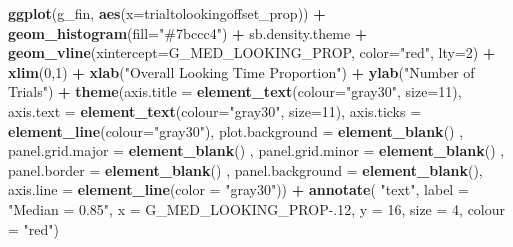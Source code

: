 \documentclass[
  doc,floatsintext]{apa6}
\newenvironment{Shaded}{\begin{snugshade}}{\end{snugshade}}
\newcommand{\AttributeTok}[1]{\textcolor[rgb]{0.13,0.29,0.53}{#1}}
\newcommand{\DecValTok}[1]{\textcolor[rgb]{0.00,0.00,0.81}{#1}}
\newcommand{\FloatTok}[1]{\textcolor[rgb]{0.00,0.00,0.81}{#1}}
\newcommand{\FunctionTok}[1]{\textcolor[rgb]{0.13,0.29,0.53}{\textbf{#1}}}
\newcommand{\NormalTok}[1]{#1}
\newcommand{\SpecialCharTok}[1]{\textcolor[rgb]{0.81,0.36,0.00}{\textbf{#1}}}
\newcommand{\StringTok}[1]{\textcolor[rgb]{0.31,0.60,0.02}{#1}}
\begin{document}
\begin{Shaded}
\begin{Highlighting}[]
\FunctionTok{ggplot}\NormalTok{(g\_fin, }\FunctionTok{aes}\NormalTok{(}\AttributeTok{x=}\NormalTok{trialtolookingoffset\_prop)) }\SpecialCharTok{+}
  \FunctionTok{geom\_histogram}\NormalTok{(}\AttributeTok{fill=}\StringTok{"\#7bccc4"}\NormalTok{) }\SpecialCharTok{+}
\NormalTok{  sb.density.theme }\SpecialCharTok{+}
  \FunctionTok{geom\_vline}\NormalTok{(}\AttributeTok{xintercept=}\NormalTok{G\_MED\_LOOKING\_PROP, }\AttributeTok{color=}\StringTok{"red"}\NormalTok{, }\AttributeTok{lty=}\DecValTok{2}\NormalTok{) }\SpecialCharTok{+}
  \FunctionTok{xlim}\NormalTok{(}\DecValTok{0}\NormalTok{,}\DecValTok{1}\NormalTok{) }\SpecialCharTok{+}
  \FunctionTok{xlab}\NormalTok{(}\StringTok{"Overall Looking Time Proportion"}\NormalTok{) }\SpecialCharTok{+}
  \FunctionTok{ylab}\NormalTok{(}\StringTok{"Number of Trials"}\NormalTok{) }\SpecialCharTok{+} 
  \FunctionTok{theme}\NormalTok{(}\AttributeTok{axis.title =} \FunctionTok{element\_text}\NormalTok{(}\AttributeTok{colour=}\StringTok{"gray30"}\NormalTok{, }\AttributeTok{size=}\DecValTok{11}\NormalTok{),}
        \AttributeTok{axis.text =} \FunctionTok{element\_text}\NormalTok{(}\AttributeTok{colour=}\StringTok{"gray30"}\NormalTok{, }\AttributeTok{size=}\DecValTok{11}\NormalTok{),}
        \AttributeTok{axis.ticks =} \FunctionTok{element\_line}\NormalTok{(}\AttributeTok{colour=}\StringTok{"gray30"}\NormalTok{),}
        \AttributeTok{plot.background =} \FunctionTok{element\_blank}\NormalTok{() ,}
        \AttributeTok{panel.grid.major =} \FunctionTok{element\_blank}\NormalTok{() ,}
        \AttributeTok{panel.grid.minor =} \FunctionTok{element\_blank}\NormalTok{() ,}
        \AttributeTok{panel.border =} \FunctionTok{element\_blank}\NormalTok{() ,}
        \AttributeTok{panel.background =} \FunctionTok{element\_blank}\NormalTok{(),}
        \AttributeTok{axis.line =} \FunctionTok{element\_line}\NormalTok{(}\AttributeTok{color =} \StringTok{"gray30"}\NormalTok{)) }\SpecialCharTok{+}
  \FunctionTok{annotate}\NormalTok{(}
    \StringTok{"text"}\NormalTok{, }\AttributeTok{label =} \StringTok{"Median = 0.85"}\NormalTok{,}
    \AttributeTok{x =}\NormalTok{ G\_MED\_LOOKING\_PROP}\FloatTok{{-}.12}\NormalTok{, }\AttributeTok{y =} \DecValTok{16}\NormalTok{, }\AttributeTok{size =} \DecValTok{4}\NormalTok{, }\AttributeTok{colour =} \StringTok{"red"}\NormalTok{)}
\end{Highlighting}
\end{Shaded}
\end{document}
